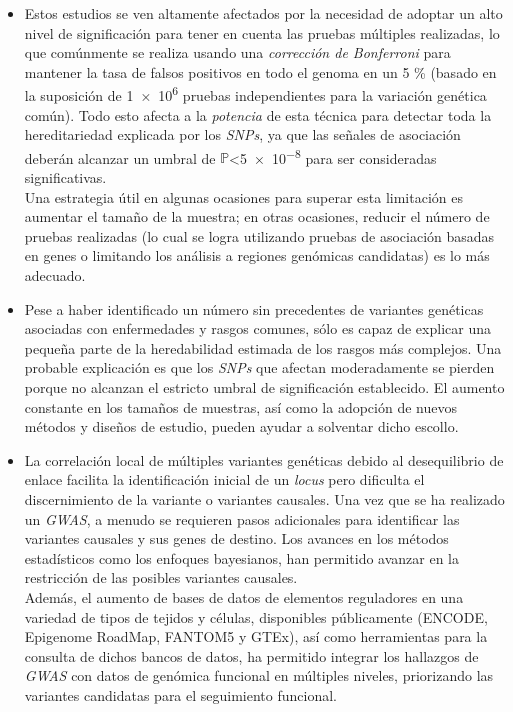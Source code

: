 \documentclass[IB,BIB]{TFUOC}%
\begin{document}
\begin{itemize}
    \item Estos estudios se ven altamente afectados por la necesidad de adoptar un alto nivel de significación para tener en cuenta las pruebas múltiples realizadas, lo que comúnmente se realiza usando una \textit{corrección de Bonferroni} para mantener la tasa de falsos positivos en todo el genoma en un 5 \% (basado en la suposición de \num{1e6} pruebas independientes para la variación genética común). Todo esto afecta a la \textit{potencia} de esta técnica para detectar toda la hereditariedad explicada por los \textit{SNPs}, ya que las señales de asociación deberán alcanzar un umbral de \( \mathbb P \)<\num{5e-8} para ser consideradas significativas. \\
Una estrategia útil en algunas ocasiones para superar esta limitación es aumentar el tamaño de la muestra; en otras ocasiones, reducir el número de pruebas realizadas (lo cual se logra utilizando pruebas de asociación basadas en genes o limitando los análisis a regiones genómicas candidatas) es lo más adecuado.
    \item Pese a haber identificado un número sin precedentes de variantes genéticas asociadas con enfermedades y rasgos comunes, sólo es capaz de explicar una pequeña parte de la heredabilidad estimada de los rasgos más complejos. Una probable explicación es que los \textit{SNPs} que afectan moderadamente se pierden porque no alcanzan el estricto umbral de significación establecido. El aumento constante en los tamaños de muestras, así como la adopción de nuevos métodos y diseños de estudio, pueden ayudar a solventar dicho escollo.
    \item La correlación local de múltiples variantes genéticas debido al desequilibrio de enlace facilita la identificación inicial de un \textit{locus} pero dificulta el discernimiento de la variante o variantes causales. Una vez que se ha realizado un \textit{GWAS}, a menudo se requieren pasos adicionales para identificar las variantes causales y sus genes de destino. Los avances en los métodos estadísticos como los enfoques bayesianos, han permitido avanzar en la restricción de las posibles variantes causales. \\
    Además, el aumento de bases de datos de elementos reguladores en una variedad de tipos de tejidos y células, disponibles públicamente  (ENCODE, Epigenome RoadMap, FANTOM5 y GTEx), así como herramientas para la consulta de dichos bancos de datos, ha permitido integrar los hallazgos de \textit{GWAS} con datos de genómica funcional en múltiples niveles, priorizando las variantes candidatas para el seguimiento funcional.

\end{itemize}
\end{document}
